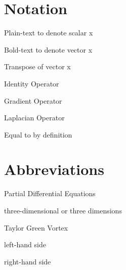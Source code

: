 
\section*{Notation}
\begin{description}[font=\rmfamily\bfseries, leftmargin=3cm, style=nextline]
	\item[\textnormal{x}] Plain-text to denote scalar x
	\item[$\bds x$] Bold-text to denote vector x
	\item[$\bds x^\intercal$] Transpose of vector x
	\item[$I$] Identity Operator
	\item[$\bn$] Gradient Operator
	\item[$\Delta$] Laplacian Operator
	\item[$:=$] Equal to by definition
\end{description}


\section*{Abbreviations}
\begin{description}[font=\rmfamily\bfseries, leftmargin=3cm, style=nextline]
	\item[PDEs] Partial Differential Equations
	\item[3D] three-dimensional or three dimensions
	\item[TGV] Taylor Green Vortex
	\item[LHS] left-hand side
	\item[RHS] right-hand side
\end{description}